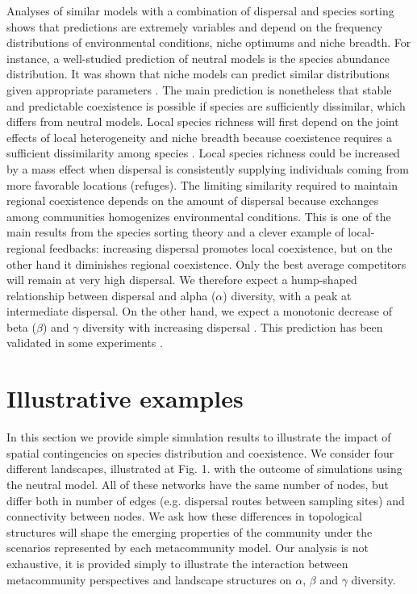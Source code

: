 \documentclass[12pt]{article}
\begin{document}
Analyses of similar models with a combination of dispersal and species sorting
shows that predictions are extremely variables and depend on the frequency
distributions of environmental conditions, niche optimums and niche breadth. For
instance, a well-studied prediction of neutral models is the species abundance
distribution. It was shown that niche models can predict similar distributions
given appropriate parameters \parencite{Tilman2004,Gravel2006}. The main
prediction is nonetheless that stable and predictable coexistence is possible if
species are sufficiently dissimilar, which differs from neutral models. Local
species richness will first depend on the joint effects of local heterogeneity
and niche breadth because coexistence requires a sufficient dissimilarity among
species \parencite{Schwilk2005}. Local species richness could be increased by a
mass effect when dispersal is consistently supplying individuals coming from
more favorable locations (refuges). The limiting similarity required to maintain
regional coexistence depends on the amount of dispersal because exchanges among
communities homogenizes environmental conditions. This is one of the main results
from the species sorting theory and a clever example of local-regional
feedbacks: increasing dispersal promotes local coexistence, but on the other
hand it diminishes regional coexistence. Only the best average competitors will
remain at very high dispersal. We therefore expect
a hump-shaped relationship between dispersal and alpha ($\alpha$) diversity,
with a peak at intermediate dispersal. On the other hand, we expect a monotonic
decrease of beta ($\beta$) and $\gamma$ diversity with increasing dispersal
\parencite{Mouquet2003}. This prediction has been validated in some experiments
\parencite{Venail2008, Logue2011}.

\section*{Illustrative examples}

In this section we provide simple simulation results to illustrate the impact of
spatial contingencies on species distribution and coexistence. We consider four
different landscapes, illustrated at Fig. 1. with the outcome of simulations
using the neutral model. All of these networks have the same number of nodes,
but differ both in number of edges (e.g. dispersal routes between sampling
sites) and connectivity between nodes. We ask how these differences
in topological structures will shape the emerging properties of the community under the
scenarios represented by each metacommunity model. Our analysis is not
exhaustive, it is provided simply to illustrate the interaction between
metacommunity perspectives and landscape structures on $\alpha$, $\beta$ and
$\gamma$ diversity.
\end{document}
